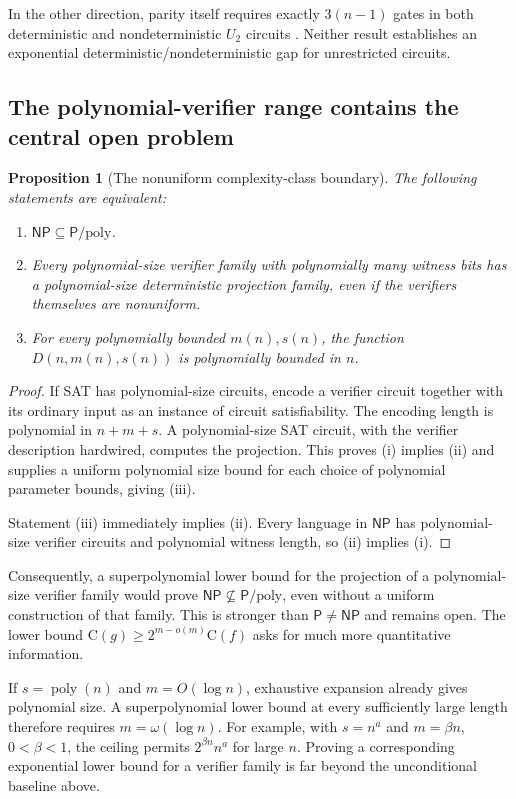 \documentclass[11pt]{article}
\newtheorem{proposition}[theorem]{Proposition}
\theoremstyle{definition}
\theoremstyle{remark}
\newcommand{\C}{\mathrm{C}}
\newcommand{\NP}{\mathsf{NP}}
\newcommand{\Ppoly}{\mathsf{P}/\mathrm{poly}}
\newcommand{\poly}{\operatorname{poly}}
\begin{document}
In the other direction, parity itself requires exactly $3(n-1)$ gates
in both deterministic and nondeterministic $U_2$ circuits
\citep{Morizumi2015}. Neither result establishes an exponential
deterministic/nondeterministic gap for unrestricted circuits.

\subsection{The polynomial-verifier range contains the central open problem}

\begin{proposition}[The nonuniform complexity-class boundary]
The following statements are equivalent:
\begin{enumerate}[label=(\roman*)]
 \item $\NP\subseteq\Ppoly$.
 \item Every polynomial-size verifier family with polynomially many
       witness bits has a polynomial-size deterministic projection
       family, even if the verifiers themselves are nonuniform.
 \item For every polynomially bounded $m(n),s(n)$, the function
       $D(n,m(n),s(n))$ is polynomially bounded in $n$.
\end{enumerate}
\end{proposition}
\begin{proof}
If SAT has polynomial-size circuits, encode a verifier circuit
together with its ordinary input as an instance of circuit
satisfiability. The encoding length is polynomial in $n+m+s$.
A polynomial-size SAT circuit, with the verifier description
hardwired, computes the projection. This proves (i) implies (ii)
and supplies a uniform polynomial size bound for each choice of
polynomial parameter bounds, giving (iii).

Statement (iii) immediately implies (ii). Every language in $\NP$
has polynomial-size verifier circuits and polynomial witness length,
so (ii) implies (i).
\end{proof}

Consequently, a superpolynomial lower bound for the projection of a
polynomial-size verifier family would prove
$\NP\not\subseteq\Ppoly$, even without a uniform construction of
that family. This is stronger than $\mathsf P\ne\NP$ and remains
open. The lower bound $\C(g)\ge2^{m-o(m)}\C(f)$ asks for much more
quantitative information.

If $s=\poly(n)$ and $m=O(\log n)$, exhaustive expansion already gives
polynomial size. A superpolynomial lower bound at every sufficiently
large length therefore requires $m=\omega(\log n)$.
For example, with $s=n^a$ and $m=\beta n$,
$0<\beta<1$, the ceiling permits $2^{\beta n}n^a$ for large $n$.
Proving a corresponding exponential lower bound for a verifier family
is far beyond the unconditional baseline above.
\end{document}

